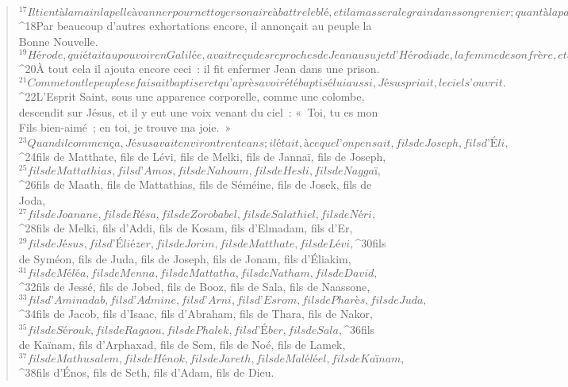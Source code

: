 \begin{verse}
${}^{17}Il tient à la main la pelle à vanner pour nettoyer son aire à battre le blé, et il amassera le grain dans son grenier ; quant à la paille, il la brûlera au feu qui ne s’éteint pas. »
${}^{18}Par beaucoup d’autres exhortations encore, il annonçait au peuple la Bonne Nouvelle. 
${}^{19}Hérode, qui était au pouvoir en Galilée, avait reçu des reproches de Jean au sujet d’Hérodiade, la femme de son frère, et au sujet de tous les méfaits qu’il avait commis. 
${}^{20}À tout cela il ajouta encore ceci : il fit enfermer Jean dans une prison.
${}^{21}Comme tout le peuple se faisait baptiser et qu’après avoir été baptisé lui aussi, Jésus priait, le ciel s’ouvrit. 
${}^{22}L’Esprit Saint, sous une apparence corporelle, comme une colombe, descendit sur Jésus, et il y eut une voix venant du ciel : « Toi, tu es mon Fils bien-aimé ; en toi, je trouve ma joie. »
${}^{23}Quand il commença, Jésus avait environ trente ans ; il était, à ce que l’on pensait, fils de Joseph, fils d’Éli, 
${}^{24}fils de Matthate, fils de Lévi, fils de Melki, fils de Jannaï, fils de Joseph, 
${}^{25}fils de Mattathias, fils d’Amos, fils de Nahoum, fils de Hesli, fils de Naggaï, 
${}^{26}fils de Maath, fils de Mattathias, fils de Séméine, fils de Josek, fils de Joda, 
${}^{27}fils de Joanane, fils de Résa,
      fils de Zorobabel, fils de Salathiel, fils de Néri, 
${}^{28}fils de Melki, fils d’Addi, fils de Kosam, fils d’Elmadam, fils d’Er, 
${}^{29}fils de Jésus, fils d’Éliézer, fils de Jorim, fils de Matthate, fils de Lévi, 
${}^{30}fils de Syméon, fils de Juda, fils de Joseph, fils de Jonam, fils d’Éliakim, 
${}^{31}fils de Méléa, fils de Menna, fils de Mattatha, fils de Natham,
      fils de David, 
${}^{32}fils de Jessé, fils de Jobed, fils de Booz, fils de Sala, fils de Naassone, 
${}^{33}fils d’Aminadab, fils d’Admine, fils d’Arni, fils d’Esrom, fils de Pharès, fils de Juda, 
${}^{34}fils de Jacob, fils d’Isaac,
      fils d’Abraham, fils de Thara, fils de Nakor, 
${}^{35}fils de Sérouk, fils de Ragaou, fils de Phalek, fils d’Éber, fils de Sala, 
${}^{36}fils de Kaïnam, fils d’Arphaxad, fils de Sem, fils de Noé, fils de Lamek, 
${}^{37}fils de Mathusalem, fils de Hénok, fils de Jareth, fils de Maléléel, fils de Kaïnam, 
${}^{38}fils d’Énos, fils de Seth, fils d’Adam,
      fils de Dieu.
      

\end{verse}
